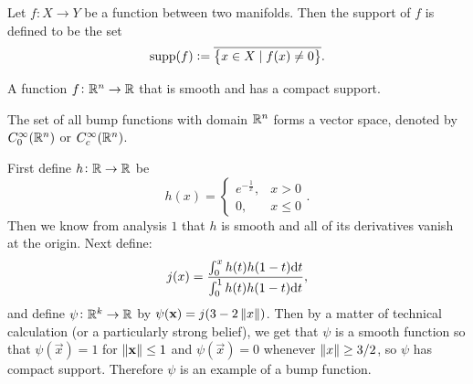 \documentclass[11pt,a4paper]{article}
\begin{document}
\begin{definition}[Support]
  Let $f \colon X \to Y$ be a function between
  two manifolds.
  Then the support of $f$ is defined to be the set
  \[
    \operatorname{supp}(f) :=
    \overline{\left\{x \in X \mid f(x) \neq 0\right\}}.
  \]
\end{definition}

\begin{definition}
  A function $f \colon \mathbb{R}^n \to \mathbb{R}$ that is smooth and has a compact support.
\end{definition}
\begin{remark}
  The set of all bump functions with domain $\mathbb{R}^n$
  forms a vector space,
  denoted by $C_0^{\infty}(\mathbb{R}^n)$ or $C_c^{\infty}(\mathbb{R}^n)$.
\end{remark}

\begin{example}
  \label{exmp:bump-function}
  First define $h \colon \mathbb{R} \to \mathbb{R}$ be
  \[
    h(x) =
    \begin{cases}
      e^{-\frac{1}{x}}, &x > 0 \\
      0, &x \le 0
    \end{cases}.
  \]
  Then we know from analysis $1$ that $h$ is smooth and all of its
  derivatives vanish at the origin.
  Next define:
  \[
    j(x) =
    \frac{\int_{0}^{x} h(t) h(1 - t) \mathrm{d} t}{\int_{0}^{1} h(t) h(1 - t) \mathrm{d} t},
  \]
  and define $\psi \colon \mathbb{R}^k \to \mathbb{R}$ by $\psi(\boldsymbol{\mathbf{x}}) = j(3 - 2\left\lVert x\right\rVert)$.
  Then by a matter of technical calculation (or a particularly strong belief),
  we get that $\psi$ is a smooth function so that
  $\psi(\vec x) = 1$ for $\left\lVert\boldsymbol{\mathbf{x}}\right\rVert \le 1$ and $\psi(\vec x) = 0$ whenever
  $\left\lVert x\right\rVert \geq 3/2$, so $\psi$ has compact support.
  Therefore $\psi$ is an example of a bump function.
\end{example}
\end{document}
